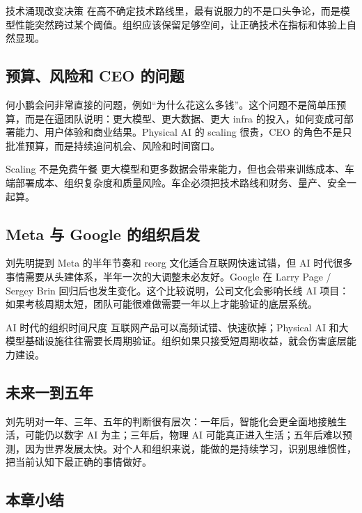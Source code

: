 \documentclass[a4paper]{article}
\begin{document}
\begin{importantbox}{技术涌现改变决策}
在高不确定技术路线里，最有说服力的不是口头争论，而是模型性能突然跨过某个阈值。组织应该保留足够空间，让正确技术在指标和体验上自然显现。
\end{importantbox}

\subsection{预算、风险和 CEO 的问题}

何小鹏会问非常直接的问题，例如“为什么花这么多钱”。这个问题不是简单压预算，而是在逼团队说明：更大模型、更大数据、更大 infra 的投入，如何变成可部署能力、用户体验和商业结果。Physical AI 的 scaling 很贵，CEO 的角色不是只批准预算，而是持续追问机会、风险和时间窗口。

\begin{warningbox}{Scaling 不是免费午餐}
更大模型和更多数据会带来能力，但也会带来训练成本、车端部署成本、组织复杂度和质量风险。车企必须把技术路线和财务、量产、安全一起算。
\end{warningbox}

\subsection{Meta 与 Google 的组织启发}

刘先明提到 Meta 的半年节奏和 reorg 文化适合互联网快速试错，但 AI 时代很多事情需要从头建体系，半年一次的大调整未必友好。Google 在 Larry Page / Sergey Brin 回归后也发生变化。这个比较说明，公司文化会影响长线 AI 项目：如果考核周期太短，团队可能很难做需要一年以上才能验证的底层系统。

\begin{knowledgebox}{AI 时代的组织时间尺度}
互联网产品可以高频试错、快速砍掉；Physical AI 和大模型基础设施往往需要长周期验证。组织如果只接受短周期收益，就会伤害底层能力建设。
\end{knowledgebox}

\subsection{未来一到五年}

刘先明对一年、三年、五年的判断很有层次：一年后，智能化会更全面地接触生活，可能仍以数字 AI 为主；三年后，物理 AI 可能真正进入生活；五年后难以预测，因为世界发展太快。对个人和组织来说，能做的是持续学习，识别思维惯性，把当前认知下最正确的事情做好。

\subsection{本章小结}
\end{document}

